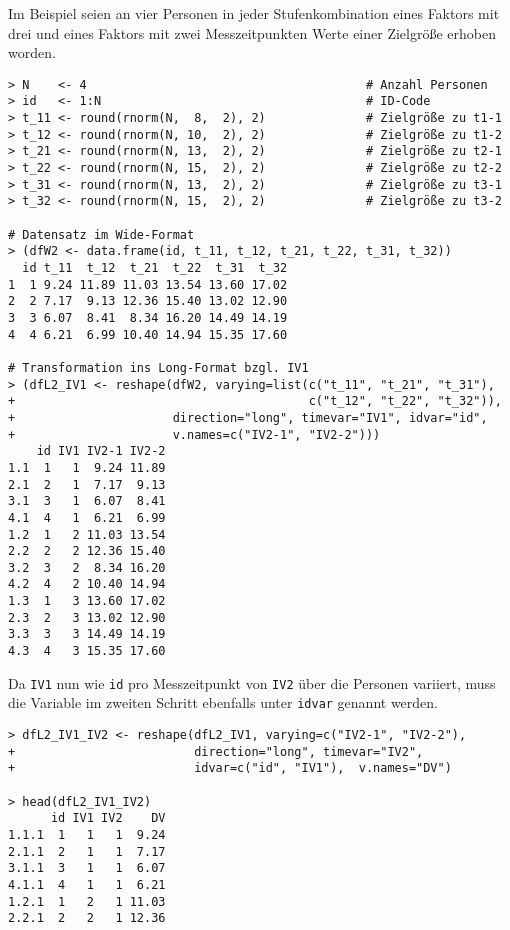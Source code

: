 Im Beispiel seien an vier Personen in jeder Stufenkombination eines Faktors mit drei und eines Faktors mit zwei Messzeitpunkten Werte einer Zielgröße erhoben worden.
\begin{lstlisting}
> N    <- 4                                       # Anzahl Personen
> id   <- 1:N                                     # ID-Code
> t_11 <- round(rnorm(N,  8,  2), 2)              # Zielgröße zu t1-1
> t_12 <- round(rnorm(N, 10,  2), 2)              # Zielgröße zu t1-2
> t_21 <- round(rnorm(N, 13,  2), 2)              # Zielgröße zu t2-1
> t_22 <- round(rnorm(N, 15,  2), 2)              # Zielgröße zu t2-2
> t_31 <- round(rnorm(N, 13,  2), 2)              # Zielgröße zu t3-1
> t_32 <- round(rnorm(N, 15,  2), 2)              # Zielgröße zu t3-2

# Datensatz im Wide-Format
> (dfW2 <- data.frame(id, t_11, t_12, t_21, t_22, t_31, t_32))
  id t_11  t_12  t_21  t_22  t_31  t_32
1  1 9.24 11.89 11.03 13.54 13.60 17.02
2  2 7.17  9.13 12.36 15.40 13.02 12.90
3  3 6.07  8.41  8.34 16.20 14.49 14.19
4  4 6.21  6.99 10.40 14.94 15.35 17.60

# Transformation ins Long-Format bzgl. IV1
> (dfL2_IV1 <- reshape(dfW2, varying=list(c("t_11", "t_21", "t_31"),
+                                         c("t_12", "t_22", "t_32")),
+                      direction="long", timevar="IV1", idvar="id",
+                      v.names=c("IV2-1", "IV2-2")))
    id IV1 IV2-1 IV2-2
1.1  1   1  9.24 11.89
2.1  2   1  7.17  9.13
3.1  3   1  6.07  8.41
4.1  4   1  6.21  6.99
1.2  1   2 11.03 13.54
2.2  2   2 12.36 15.40
3.2  3   2  8.34 16.20
4.2  4   2 10.40 14.94
1.3  1   3 13.60 17.02
2.3  2   3 13.02 12.90
3.3  3   3 14.49 14.19
4.3  4   3 15.35 17.60
\end{lstlisting}

Da \lstinline!IV1! nun wie \lstinline!id! pro Messzeitpunkt von \lstinline!IV2! über die Personen variiert, muss die Variable im zweiten Schritt ebenfalls unter \lstinline!idvar! genannt werden.
\begin{lstlisting}
> dfL2_IV1_IV2 <- reshape(dfL2_IV1, varying=c("IV2-1", "IV2-2"),
+                         direction="long", timevar="IV2",
+                         idvar=c("id", "IV1"),  v.names="DV")

> head(dfL2_IV1_IV2)
      id IV1 IV2    DV
1.1.1  1   1   1  9.24
2.1.1  2   1   1  7.17
3.1.1  3   1   1  6.07
4.1.1  4   1   1  6.21
1.2.1  1   2   1 11.03
2.2.1  2   2   1 12.36
\end{lstlisting}

